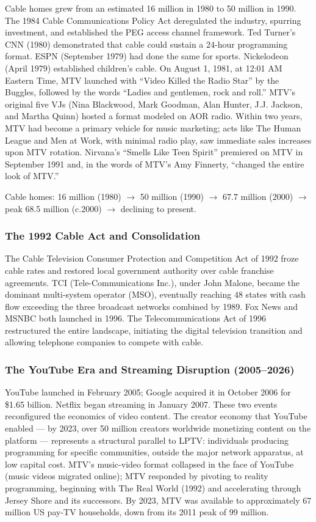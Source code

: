 \documentclass[11pt,letterpaper]{article}
\begin{document}
Cable homes grew from an estimated 16 million in 1980 to 50 million in 1990. The 1984 Cable Communications Policy Act deregulated the industry, spurring investment, and established the PEG access channel framework. Ted Turner's CNN (1980) demonstrated that cable could sustain a 24-hour programming format. ESPN (September 1979) had done the same for sports. Nickelodeon (April 1979) established children's cable. On August 1, 1981, at 12:01 AM Eastern Time, MTV launched with ``Video Killed the Radio Star'' by the Buggles, followed by the words ``Ladies and gentlemen, rock and roll.'' MTV's original five VJs (Nina Blackwood, Mark Goodman, Alan Hunter, J.J. Jackson, and Martha Quinn) hosted a format modeled on AOR radio. Within two years, MTV had become a primary vehicle for music marketing; acts like The Human League and Men at Work, with minimal radio play, saw immediate sales increases upon MTV rotation. Nirvana's ``Smells Like Teen Spirit'' premiered on MTV in September 1991 and, in the words of MTV's Amy Finnerty, ``changed the entire look of MTV.''

Cable homes: 16 million (1980) $\to$ 50 million (1990) $\to$ 67.7 million (2000) $\to$ peak 68.5 million (c.2000) $\to$ declining to present.

\subsubsection{The 1992 Cable Act and Consolidation}

The Cable Television Consumer Protection and Competition Act of 1992 froze cable rates and restored local government authority over cable franchise agreements. TCI (Tele-Communications Inc.), under John Malone, became the dominant multi-system operator (MSO), eventually reaching 48 states with cash flow exceeding the three broadcast networks combined by 1989. Fox News and MSNBC both launched in 1996. The Telecommunications Act of 1996 restructured the entire landscape, initiating the digital television transition and allowing telephone companies to compete with cable.

\subsubsection{The YouTube Era and Streaming Disruption (2005--2026)}

YouTube launched in February 2005; Google acquired it in October 2006 for \$1.65 billion. Netflix began streaming in January 2007. These two events reconfigured the economics of video content. The creator economy that YouTube enabled --- by 2023, over 50 million creators worldwide monetizing content on the platform --- represents a structural parallel to LPTV: individuals producing programming for specific communities, outside the major network apparatus, at low capital cost. MTV's music-video format collapsed in the face of YouTube (music videos migrated online); MTV responded by pivoting to reality programming, beginning with The Real World (1992) and accelerating through Jersey Shore and its successors. By 2023, MTV was available to approximately 67 million US pay-TV households, down from its 2011 peak of 99 million.
\end{document}
